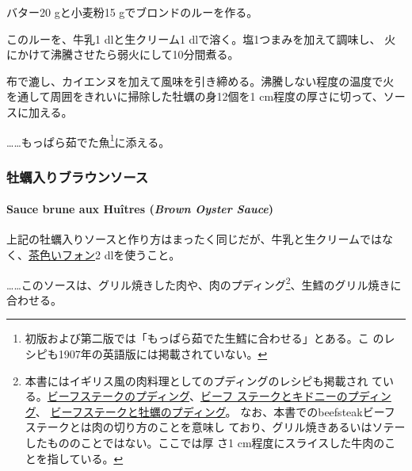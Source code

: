 \begin{recette}
バター20 gと小麦粉15 gでブロンドのルーを作る。

このルーを、牛乳1 dlと生クリーム1 dlで溶く。塩1つまみを加えて調味し、
火にかけて沸騰させたら弱火にして10分間煮る。

布で漉し、カイエンヌを加えて風味を引き締める。沸騰しない程度の温度で火
を通して周囲をきれいに掃除した牡蠣の身12個を1 cm程度の厚さに切って、ソー
スに加える。

\ldots{}\ldots{}もっぱら茹でた魚\footnote{初版および第二版では「もっぱら茹でた生鱈に合わせる」とある。こ
  のレシピも1907年の英語版には掲載されていない。}に添える。

\maeaki

\hypertarget{ux7261ux8823ux5165ux308aux30d6ux30e9ux30a6ux30f3ux30bdux30fcux30b9}{%
\subsubsection{牡蠣入りブラウンソース}\label{ux7261ux8823ux5165ux308aux30d6ux30e9ux30a6ux30f3ux30bdux30fcux30b9}}

\hypertarget{brown-oyster-sauce}{%
\paragraph{\texorpdfstring{Sauce brune aux Huîtres (\emph{Brown Oyster
Sauce})}{Sauce brune aux Huîtres (Brown Oyster Sauce)}}\label{brown-oyster-sauce}}


上記の牡蠣入りソースと作り方はまったく同じだが、牛乳と生クリームではな
く、\protect\hyperlink{fonds-brun}{茶色いフォン}2 dlを使うこと。

\ldots{}\ldots{}このソースは、グリル焼きした肉や、肉のプディング\footnote{本書にはイギリス風の肉料理としてのプディングのレシピも掲載され
  ている。\protect\hyperlink{beefsteak-pudding}{ビーフステークのプディング}、\protect\hyperlink{beefsteak-and-kidney-pudding}{ビーフ
  ステークとキドニーのプディング}、
  \protect\hyperlink{beefsteak-and-oysters-pudding}{ビーフステークと牡蠣のプディング}。
  なお、本書でのbeefsteakビーフステークとは肉の切り方のことを意味し
  ており、グリル焼きあるいはソテーしたもののことではない。ここでは厚 さ1
  cm程度にスライスした牛肉のことを指している。}、生鱈のグリル焼きに合わせる。


\end{recette}
